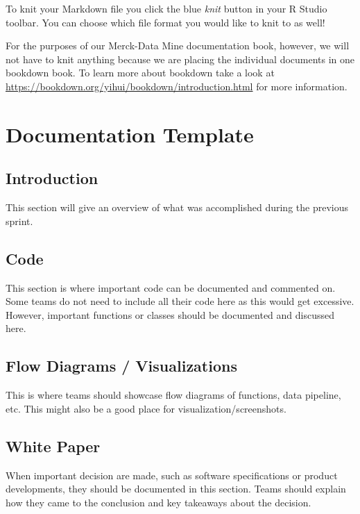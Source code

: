 \documentclass[]{book}
\begin{document}
To knit your Markdown file you click the blue \emph{knit} button in your R Studio toolbar. You can choose which file format you would like to knit to as well!

For the purposes of our Merck-Data Mine documentation book, however, we will not have to knit anything because we are placing the individual documents in one bookdown book. To learn more about bookdown take a look at \url{https://bookdown.org/yihui/bookdown/introduction.html} for more information.

\hypertarget{documentation-template}{%
\chapter{Documentation Template}\label{documentation-template}}

\hypertarget{introduction}{%
\section{Introduction}\label{introduction}}

This section will give an overview of what was accomplished during the previous sprint.

\hypertarget{code}{%
\section{Code}\label{code}}

This section is where important code can be documented and commented on. Some teams do not need to include all their code here as this would get excessive. However, important functions or classes should be documented and discussed here.

\hypertarget{flow-diagrams-visualizations}{%
\section{Flow Diagrams / Visualizations}\label{flow-diagrams-visualizations}}

This is where teams should showcase flow diagrams of functions, data pipeline, etc. This might also be a good place for visualization/screenshots.

\hypertarget{white-paper}{%
\section{White Paper}\label{white-paper}}

When important decision are made, such as software specifications or product developments, they should be documented in this section. Teams should explain how they came to the conclusion and key takeaways about the decision.
\end{document}
